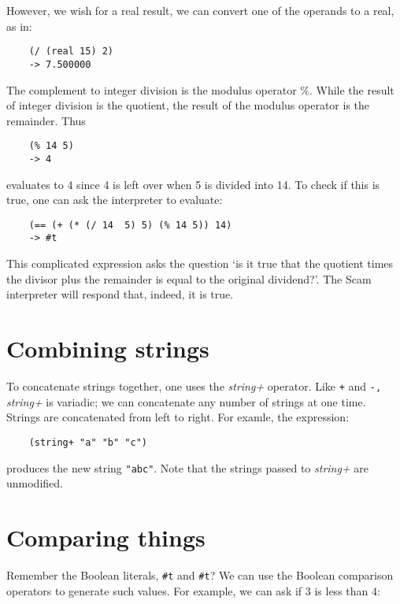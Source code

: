 However, we wish for a real result, we can convert one of
the operands to a real, as in:

\begin{verbatim}
    (/ (real 15) 2)
    -> 7.500000
\end{verbatim}

The complement to integer division is the modulus operator \%. While the
result of integer division is the quotient, the result of the modulus
operator is the remainder. Thus

\begin{verbatim}
    (% 14 5)
    -> 4
\end{verbatim}

evaluates to 4 since 4 is left over when 5 is divided into 14. To check
if this is true, one can ask the interpreter to evaluate:

\begin{verbatim}
    (== (+ (* (/ 14  5) 5) (% 14 5)) 14)
    -> #t
\end{verbatim}

This complicated expression asks the question `is it true that the
quotient times the divisor plus the remainder is equal to the original
dividend?'. The Scam interpreter will respond that, indeed, it is
true. 

\section{Combining strings}

To concatenate strings together, one uses the {\it string+} operator.
Like \verb!+! and \verb!-,! {\it string+} is variadic;
we can concatenate any number of
strings at one time. Strings are concatenated from left to right.
For examle, the expression:

\begin{verbatim}
    (string+ "a" "b" "c")
\end{verbatim}

produces the new string \verb!"abc"!. Note that the strings passed
to {\it string+} are
unmodified.

\section{Comparing things}

Remember the {\sc Boolean} literals, {\tt \#t} and {\tt \#t}?
We can use the {\sc Boolean}
comparison operators to generate such values. For example, we can ask
if 3 is less than 4:

